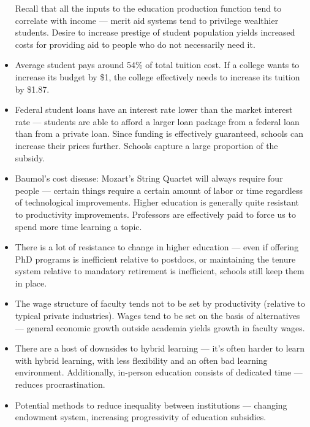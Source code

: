 \documentclass[10pt]{extarticle}
\begin{document}
\begin{itemize}
      Recall that all the inputs to the education production function tend to correlate with income --- merit aid systems tend to privilege wealthier students. Desire to increase prestige of student population yields increased costs for providing aid to people who do not necessarily need it.
    \item Average student pays around 54\% of total tuition cost. If a college wants to increase its budget by \$1, the college effectively needs to increase its tuition by \$1.87.
    \item Federal student loans have an interest rate lower than the market interest rate --- students are able to afford a larger loan package from a federal loan than from a private loan. Since funding is effectively guaranteed, schools can increase their prices further. Schools capture a large proportion of the subsidy.
    \item Baumol's cost disease: Mozart's String Quartet will always require four people --- certain things require a certain amount of labor or time regardless of technological improvements. Higher education is generally quite resistant to productivity improvements. Professors are effectively paid to force us to spend more time learning a topic.
    \item There is a lot of resistance to change in higher education --- even if offering PhD programs is inefficient relative to postdocs, or maintaining the tenure system relative to mandatory retirement is inefficient, schools still keep them in place.
    \item The wage structure of faculty tends not to be set by productivity (relative to typical private industries). Wages tend to be set on the basis of alternatives --- general economic growth outside academia yields growth in faculty wages.
    \item There are a host of downsides to hybrid learning --- it's often harder to learn with hybrid learning, with less flexibility and an often bad learning environment. Additionally, in-person education consists of dedicated time --- reduces procrastination.
    \item Potential methods to reduce inequality between institutions --- changing endowment system, increasing progressivity of education subsidies.
  \end{itemize}
\end{document}
